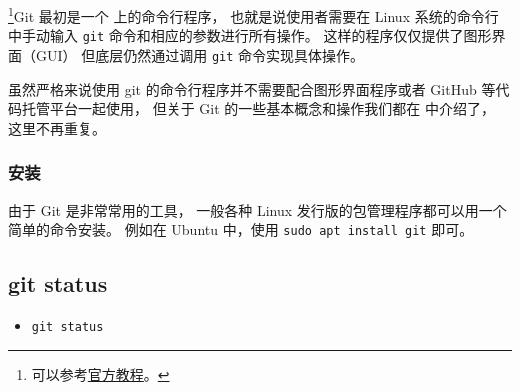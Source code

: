 
\begin{issues}
\issueDraft
\end{issues}


\footnote{可以参考\href{https://git-scm.com/book/en/v2}{官方教程}。}Git 最初是一个  上的命令行程序， 也就是说使用者需要在 Linux 系统的命令行中手动输入 \verb`git` 命令和相应的参数进行所有操作。  这样的程序仅仅提供了图形界面（GUI） 但底层仍然通过调用 \verb`git` 命令实现具体操作。

虽然严格来说使用 git 的命令行程序并不需要配合图形界面程序或者 GitHub 等代码托管平台一起使用， 但关于 Git 的一些基本概念和操作我们都在  中介绍了， 这里不再重复。

\subsubsection{安装}
由于 Git 是非常常用的工具， 一般各种 Linux 发行版的包管理程序都可以用一个简单的命令安装。 例如在 Ubuntu 中，使用 \verb`sudo apt install git` 即可。

\subsection{git status}
\begin{itemize}
\item \verb`git status`
\end{itemize}
